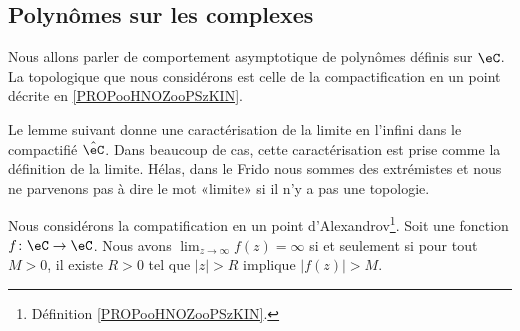 \subsection{Polynômes sur les complexes}

Nous allons parler de comportement asymptotique de polynômes définis sur \( \eC\). La topologique que nous considérons est celle de la compactification en un point décrite en \ref{PROPooHNOZooPSzKIN}.

Le lemme suivant donne une caractérisation de la limite en l'infini dans le compactifié \( \hat \eC\). Dans beaucoup de cas, cette caractérisation est prise comme la définition de la limite. Hélas, dans le Frido nous sommes des extrémistes et nous ne parvenons pas à dire le mot «limite» si il n'y a pas une topologie.
\begin{lemma}        \label{LEMooERABooQjLBzW}
    Nous considérons la compatification en un point d'Alexandrov\footnote{Définition \ref{PROPooHNOZooPSzKIN}.}. Soit une fonction \( f\colon \eC\to \eC\). Nous avons \( \lim_{z\to \infty} f(z)=\infty\) si et seulement si pour tout \( M>0\), il existe \( R>0\) tel que \( | z |>R\) implique \( | f(z) |>M\).
\end{lemma}

